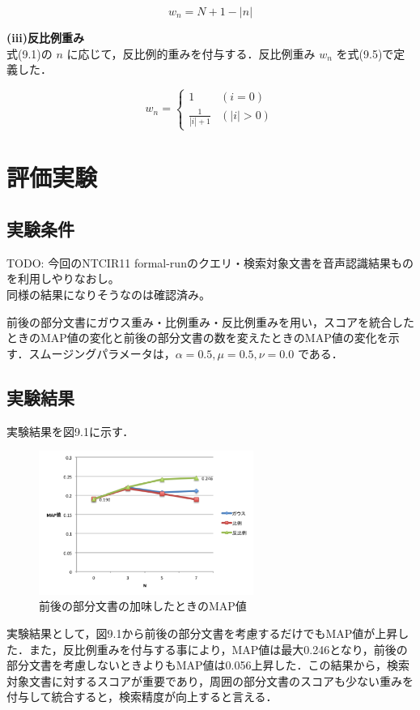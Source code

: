 \begin{equation}
    w_n = N+1-|n|
    \label{zengo4}
\end{equation}

{\bf(iii)反比例重み} \\

式(9.1)の $n$ に応じて，反比例的重みを付与する．反比例重み $w_n$ を式(9.5)で定義した．

\begin{equation}
    w_n = 
    \begin{cases} 
        1 & (i = 0)\\ 
        \frac{1}{|i|+1} & (|i| > 0)
    \end{cases} 
    \label{zengo5}
\end{equation}

\section{評価実験}
\subsection{実験条件}

{\Large TODO: 今回のNTCIR11 formal-runのクエリ・検索対象文書を音声認識結果ものを利用しやりなおし。 \\
同様の結果になりそうなのは確認済み。}

前後の部分文書にガウス重み・比例重み・反比例重みを用い，スコアを統合したときのMAP値の変化と前後の部分文書の数を変えたときのMAP値の変化を示す．スムージングパラメータは，$\alpha= 0.5, \mu= 0.5, \nu= 0.0$ である．

\subsection{実験結果}
実験結果を図9.1に示す．

\begin{figure}
    \centering
    \includegraphics[width=7cm]{./image/zengo.png}
    \caption{前後の部分文書の加味したときのMAP値}
    \label{web_result1}
\end{figure}

実験結果として，図9.1から前後の部分文書を考慮するだけでもMAP値が上昇した．また，反比例重みを付与する事により，MAP値は最大0.246となり，前後の部分文書を考慮しないときよりもMAP値は0.056上昇した．この結果から，検索対象文書に対するスコアが重要であり，周囲の部分文書のスコアも少ない重みを付与して統合すると，検索精度が向上すると言える．


